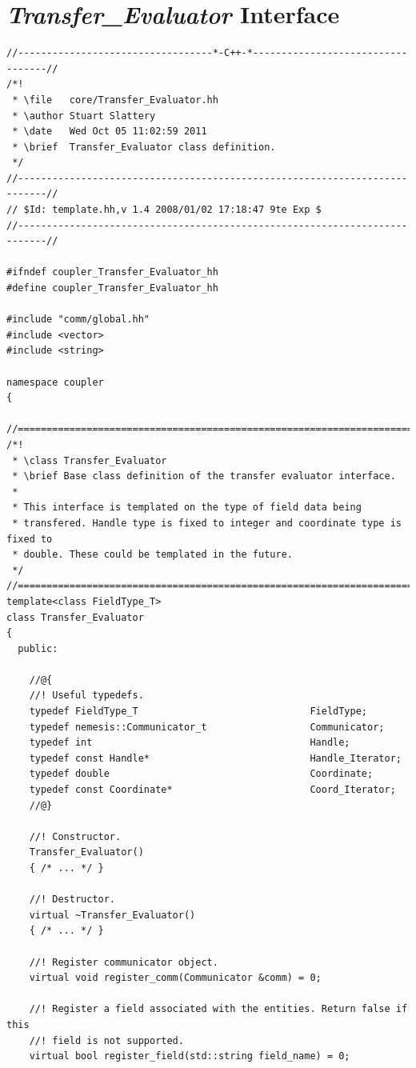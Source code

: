 \documentclass[letterpaper]{article}
\begin{document}
\section{ {\sl Transfer\_Evaluator} Interface}
\begin{lstlisting}
//----------------------------------*-C++-*----------------------------------//
/*!
 * \file   core/Transfer_Evaluator.hh
 * \author Stuart Slattery
 * \date   Wed Oct 05 11:02:59 2011
 * \brief  Transfer_Evaluator class definition.
 */
//---------------------------------------------------------------------------//
// $Id: template.hh,v 1.4 2008/01/02 17:18:47 9te Exp $
//---------------------------------------------------------------------------//

#ifndef coupler_Transfer_Evaluator_hh
#define coupler_Transfer_Evaluator_hh

#include "comm/global.hh"
#include <vector>
#include <string>

namespace coupler
{

//===========================================================================//
/*!
 * \class Transfer_Evaluator
 * \brief Base class definition of the transfer evaluator interface.
 *
 * This interface is templated on the type of field data being
 * transfered. Handle type is fixed to integer and coordinate type is fixed to
 * double. These could be templated in the future.
 */
//===========================================================================//
template<class FieldType_T>
class Transfer_Evaluator 
{
  public:

    //@{
    //! Useful typedefs.
    typedef FieldType_T                              FieldType;
    typedef nemesis::Communicator_t                  Communicator;
    typedef int                                      Handle;
    typedef const Handle*                            Handle_Iterator;
    typedef double                                   Coordinate;
    typedef const Coordinate*                        Coord_Iterator;
    //@}

    //! Constructor.
    Transfer_Evaluator()
    { /* ... */ }

    //! Destructor.
    virtual ~Transfer_Evaluator()
    { /* ... */ }

    //! Register communicator object.
    virtual void register_comm(Communicator &comm) = 0;

    //! Register a field associated with the entities. Return false if this
    //! field is not supported.
    virtual bool register_field(std::string field_name) = 0;


\end{lstlisting}
\end{document}
